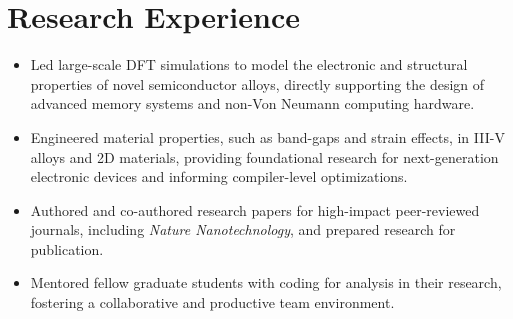 \documentclass[letter,11pt]{article}
\begin{document}
\section{Research Experience}
\begin{itemize}
    \item Led large-scale DFT simulations to model the electronic and structural properties of novel semiconductor alloys, directly supporting the design of advanced memory systems and non-Von Neumann computing hardware.
    \item Engineered material properties, such as band-gaps and strain effects, in III-V alloys and 2D materials, providing foundational research for next-generation electronic devices and informing compiler-level optimizations.
    \item Authored and co-authored research papers for high-impact peer-reviewed journals, including \textit{Nature Nanotechnology}, and prepared research for publication.
    \item Mentored fellow graduate students with coding for analysis in their research, fostering a collaborative and productive team environment.
\end{itemize}
\end{document}

